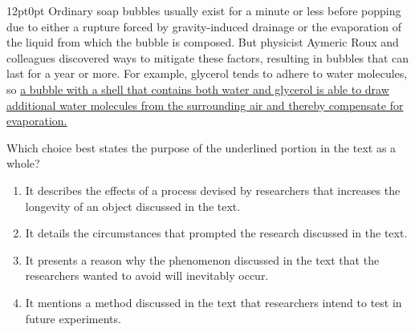 \documentclass[11pt, twocolumn]{article}
\newcounter{questionnum}
\begin{document}
\vspace{6pt}\noindent
\begin{minipage}{\columnwidth}\raggedright
\noindent{}\par\vspace{8pt}
\begin{adjustwidth}{12pt}{0pt}
Ordinary soap bubbles usually exist for a minute or less before popping due to either a rupture forced by gravity-induced drainage or the evaporation of the liquid from which the bubble is composed. But physicist Aymeric Roux and colleagues discovered ways to mitigate these factors, resulting in bubbles that can last for a year or more. For example, glycerol tends to adhere to water molecules, so \uline{a bubble with a shell that contains both water and glycerol is able to draw additional water molecules from the surrounding air and thereby compensate for evaporation.}
\vspace{6pt}

Which choice best states the purpose of the underlined portion in the text as a whole?
\begin{enumerate}[label=\Alph*),leftmargin=18pt,topsep=3pt,itemsep=2pt]
  \item It describes the effects of a process devised by researchers that increases the longevity of an object discussed in the text.
  \item It details the circumstances that prompted the research discussed in the text.
  \item It presents a reason why the phenomenon discussed in the text that the researchers wanted to avoid will inevitably occur.
  \item It mentions a method discussed in the text that researchers intend to test in future experiments.
\end{enumerate}
\end{adjustwidth}
\end{minipage}\par
\end{document}
